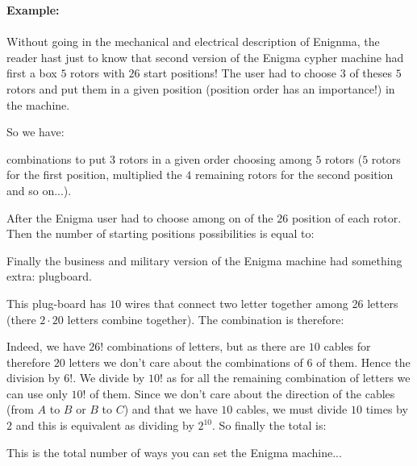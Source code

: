 	\begin{tcolorbox}[colframe=black,colback=white,sharp corners]
	\textbf{{\Large {}}Example:}\\\\
	Without going in the mechanical and electrical description of Enignma, the reader hast just to know that second version of the Enigma cypher machine had first a box $5$ rotors with $26$ start positions! The user had to choose $3$ of theses $5$ rotors and put them in a given position (position order has an importance!) in the machine.

	So we have:
	
	combinations to put $3$ rotors in a given order choosing among $5$ rotors ($5$ rotors for the first  position, multiplied the $4$ remaining rotors for the second position and so on...).
	
	After the Enigma user had to choose among on of the $26$ position of each rotor. Then the number of starting positions possibilities is equal to:
	
	Finally the business and military version of the Enigma machine had something extra: plugboard.
	
	This plug-board has $10$ wires that connect two letter together among 26 letters (there $2\cdot 20$ letters combine together). The combination is therefore:
	
	Indeed, we have $26!$ combinations of letters, but as there are $10$ cables for therefore $20$ letters we don't care about the combinations of $6$ of them. Hence the division by $6!$. We divide by $10!$ as for all the remaining combination of letters we can use only $10!$ of them. Since we don't care about the direction of the cables (from $A$ to $B$ or $B$ to $C$) and that we have $10$ cables, we must divide $10$ times by $2$ and this is equivalent as dividing by $2^{10}$.
	So finally the total is:
	
	This is the total number of ways you can set the Enigma machine...
	\end{tcolorbox}
		
